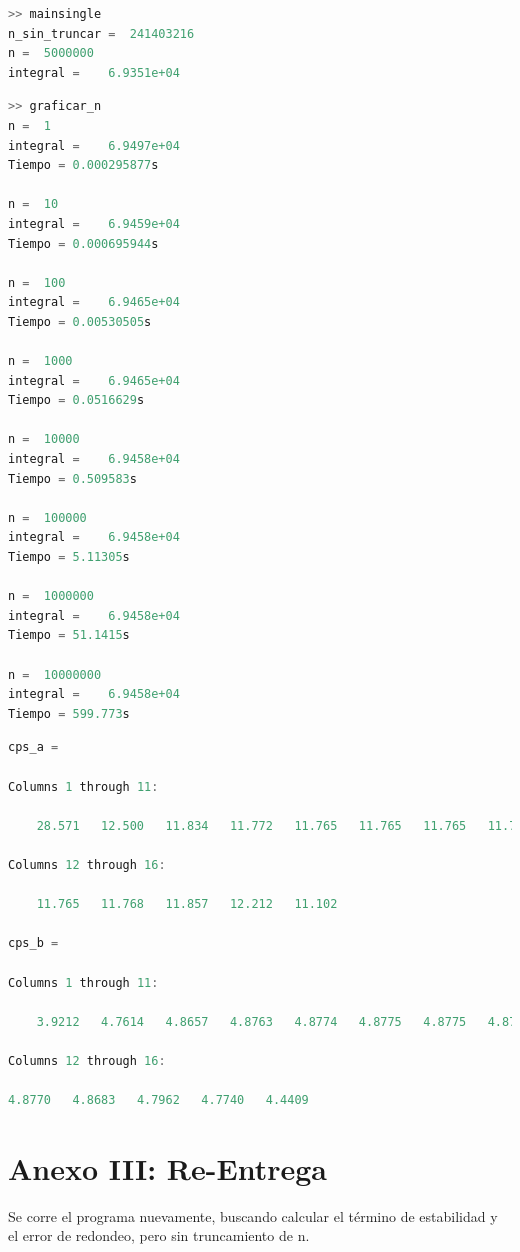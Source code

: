 \documentclass[11pt,a4paper]{article}
\begin{document}
\begin{lstlisting}[language=Octave,title=title=Corrida de \texttt{mainsingle.m}]
>> mainsingle
n_sin_truncar =  241403216
n =  5000000
integral =    6.9351e+04
\end{lstlisting}

\begin{lstlisting}[language=Octave,title=Cálculos hechos para el criterio de truncamiento de n]
>> graficar_n
n =  1
integral =    6.9497e+04
Tiempo = 0.000295877s

n =  10
integral =    6.9459e+04
Tiempo = 0.000695944s

n =  100
integral =    6.9465e+04
Tiempo = 0.00530505s

n =  1000
integral =    6.9465e+04
Tiempo = 0.0516629s

n =  10000
integral =    6.9458e+04
Tiempo = 0.509583s

n =  100000
integral =    6.9458e+04
Tiempo = 5.11305s

n =  1000000
integral =    6.9458e+04
Tiempo = 51.1415s

n =  10000000
integral =    6.9458e+04
Tiempo = 599.773s
\end{lstlisting}


\begin{lstlisting}[language=Octave,title=Cps calculados para las distintas iteraciones]
cps_a =

Columns 1 through 11:

    28.571   12.500   11.834   11.772   11.765   11.765   11.765   11.765   11.765   11.765   11.765

Columns 12 through 16:

    11.765   11.768   11.857   12.212   11.102

cps_b =

Columns 1 through 11:

    3.9212   4.7614   4.8657   4.8763   4.8774   4.8775   4.8775   4.8775   4.8775   4.8775   4.8776

Columns 12 through 16:

4.8770   4.8683   4.7962   4.7740   4.4409
\end{lstlisting}


\newpage
\section{Anexo III: Re-Entrega}

Se corre el programa nuevamente, buscando calcular el término de estabilidad y el error de redondeo, pero sin truncamiento de n.
\end{document}
